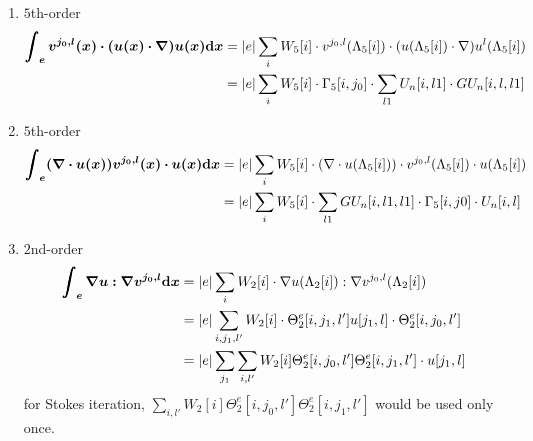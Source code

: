 \begin{enumerate}
  \item $5$th-order
    \begin{equation}
      \begin{split}
        \bm{\int_e v^{j_0,l}(x)\cdot(u(x)\cdot\nabla)u(x)\mathrm{d} x}
        &= |e|\sum_i W_5[i]\cdot v^{j_0,l}(\Lambda_5[i]) \cdot 
        (u(\Lambda_5[i])\cdot\nabla)u^l(\Lambda_5[i]) \\
        &= |e|\sum_{i} W_5[i]\cdot \Gamma_5[i,j_0] 
        \cdot \sum_{l1} U_n[i,l1] \cdot GU_n[i,l,l1]
      \end{split}
    \end{equation}

  \item $5$th-order
    \begin{equation}
      \begin{split}
        \bm{\int_e(\nabla\cdot u(x))v^{j_0,l}(x)\cdot u(x)\mathrm{d} x}
        &= |e|\sum_i W_5[i] \cdot (\nabla\cdot u(\Lambda_5[i]))\cdot 
        v^{j_0,l}(\Lambda_5[i]) \cdot u(\Lambda_5[i]) \\
        &= |e|\sum_i W_5[i] \cdot \sum_{l1} GU_n[i,l1,l1] 
        \cdot \Gamma_5[i,j0] \cdot U_n[i,l]
      \end{split}
    \end{equation}

  \item $2$nd-order
    \begin{equation}\label{eq:integral-gugv}
      \begin{split}
        \bm{\int_e \nabla u:\nabla v^{j_0,l}\mathrm{d} x} &= |e| \sum_i W_2[i]\cdot 
        \nabla u(\Lambda_2[i]) : \nabla v^{j_0,l}(\Lambda_2[i]) \\
        &= |e| \sum_{i,j_1,l'} W_2[i]\cdot 
        \Theta_2^e[i,j_1,l']u[j_1,l] \cdot \Theta_2^e[i,j_0,l'] \\
        &= |e| \sum_{j_1} \sum_{i,l'}W_2[i]\Theta_2^e[i,j_0,l']\Theta_2^e[i,j_1,l'] 
        \cdot u[j_1,l]
      \end{split}
    \end{equation}
    for Stokes iteration, $\sum_{i,l'}W_2[i]\Theta_2^e[i,j_0,l']\Theta_2^e[i,j_1,l']$
    would be used only once.


\end{enumerate}
